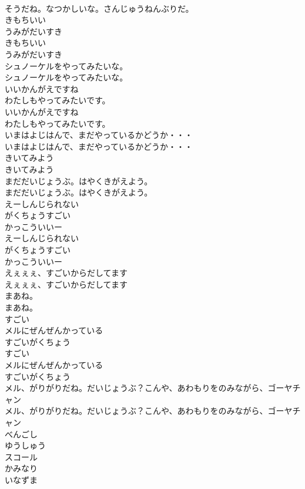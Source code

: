 \documentclass[8pt]{extreport}
\begin{document}
\begin{CJK}{UTF8}{min}
\\	そうだね。なつかしいな。さんじゅうねんぶりだ。
\\	きもちいい
\\	うみがだいすき
\\	きもちいい
\\	うみがだいすき
\\	シュノーケルをやってみたいな。
\\	シュノーケルをやってみたいな。
\\	いいかんがえですね
\\	わたしもやってみたいです。
\\	いいかんがえですね
\\	わたしもやってみたいです。
\\	いまはよじはんで、まだやっているかどうか・・・
\\	いまはよじはんで、まだやっているかどうか・・・
\\	きいてみよう
\\	きいてみよう
\\	まだだいじょうぶ。はやくきがえよう。
\\	まだだいじょうぶ。はやくきがえよう。
\\	えーしんじられない
\\	がくちょうすごい
\\	かっこういいー
\\	えーしんじられない
\\	がくちょうすごい
\\	かっこういいー
\\	えぇぇぇ、すごいからだしてます
\\	えぇぇぇ、すごいからだしてます
\\	まあね。
\\	まあね。
\\	すごい
\\	メルにぜんぜんかっている
\\	すごいがくちょう
\\	すごい
\\	メルにぜんぜんかっている
\\	すごいがくちょう
\\	メル、がりがりだね。だいじょうぶ？こんや、あわもりをのみながら、ゴーヤチャン
\\	メル、がりがりだね。だいじょうぶ？こんや、あわもりをのみながら、ゴーヤチャン
\\	べんごし
\\	ゆうしゅう
\\	スコール
\\	かみなり
\\	いなずま

\end{CJK}
\end{document}
